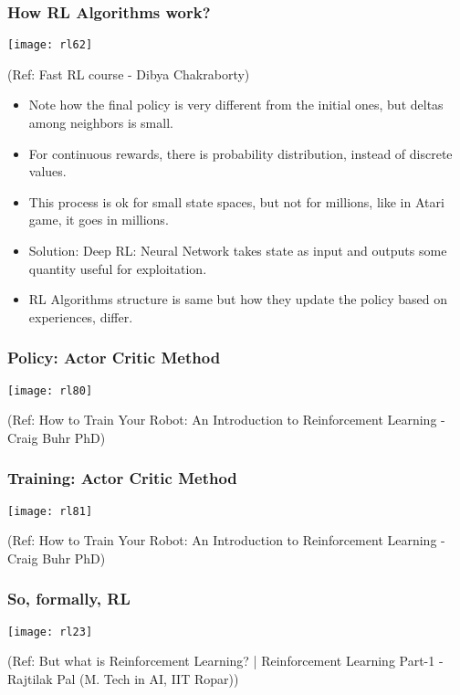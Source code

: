 \begin{frame}[fragile]\frametitle{How RL Algorithms work?}

\begin{center}
\texttt{[image: rl62]}

{\tiny (Ref: Fast RL course - Dibya Chakraborty)}
\end{center}

\begin{itemize}
\item Note how the final policy is very different from the initial ones, but deltas among neighbors is small.
\item For continuous rewards, there is probability distribution, instead of discrete values.
\item This process is ok for small state spaces, but not for millions, like in Atari game, it goes in millions. 
\item Solution: Deep RL: Neural Network takes state as input and outputs some quantity useful for exploitation.
\item RL Algorithms structure is same but how they update the policy based on experiences, differ.
\end{itemize}
\end{frame}


\begin{frame}[fragile]\frametitle{Policy: Actor Critic Method}


\begin{center}
\texttt{[image: rl80]}
\end{center}

{\tiny (Ref: How to Train Your Robot: An Introduction to Reinforcement Learning - Craig Buhr PhD)}

\end{frame}

\begin{frame}[fragile]\frametitle{Training: Actor Critic Method}


\begin{center}
\texttt{[image: rl81]}
\end{center}

{\tiny (Ref: How to Train Your Robot: An Introduction to Reinforcement Learning - Craig Buhr PhD)}

\end{frame}


\begin{frame}[fragile]\frametitle{So, formally, RL}

\begin{center}
\texttt{[image: rl23]}
\end{center}

{\tiny (Ref: But what is Reinforcement Learning? | Reinforcement Learning Part-1 - Rajtilak Pal (M. Tech in AI, IIT Ropar))}
\end{frame}
